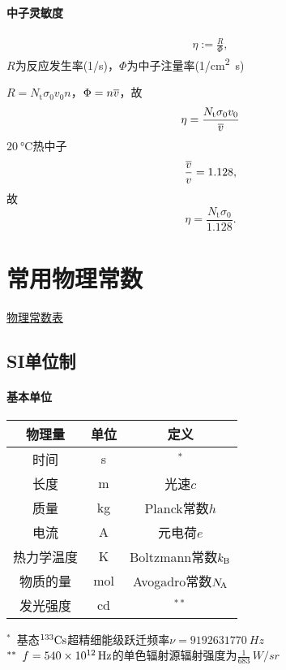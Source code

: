 \paragraph{中子灵敏度}
\begin{align}
	\eta:=\frac R\Phi,
\end{align}
$R$为反应发生率(1/s)，$\Phi$为中子注量率(\si{1/cm^2.s})

$R=N_\mathrm t\sigma_0v_0n$，$\Phi=n\overline v$，故 
\[
	\eta=\frac{N_\mathrm t\sigma_0v_0}{\overline v}
\]
$\SI{20}{\celsius}$热中子
\[
	\frac{\overline v}v=1.128,
\]
故
\[
	\eta=\frac{N_\mathrm t\sigma_0}{1.128}.
\]
\iffalse
\begin{compactenum}
	\item 
\end{compactenum}
\begin{compactitem}
	\item 
\end{compactitem}
\fi
\clearpage
\appendiks
\section{常用物理常数}
\href{https://en.wikipedia.org/wiki/List_of_physical_constants}{物理常数表}
\subsection{SI单位制}
\paragraph{基本单位}
\begin{center}
	\begin{tabular}{ccc}
		\toprule
		物理量&单位&定义\\
		\midrule
		时间&s&$^\ast$\\
		长度&m&光速$c$\\%
		质量&kg&Planck常数$h$\\%
		电流&A&元电荷$e$\\%
		热力学温度&K&Boltzmann常数$k_{\mathrm B}$\\%
		物质的量&mol&Avogadro常数$N_{\hspace{-1 pt}\mathrm A}$\\
		发光强度&cd&$^{\ast\ast}$\\
		\bottomrule
	\end{tabular}
\end{center}
$^\ast\enspace$基态${^{133}\mathrm{Cs}}$超精细能级跃迁频率$\nu=\SI{9192631770}{Hz}$\\
\noindent
$^{\ast\ast}\enspace f=\SI{540E12}{Hz}$的单色辐射源辐射强度为$\frac1{683}\,\si{W/sr}$

